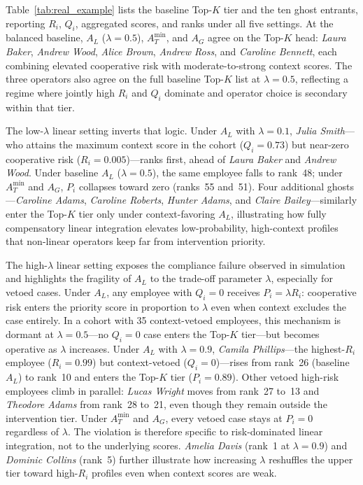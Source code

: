 \documentclass[mathematics,article,submit,moreauthors]{Definitions/mdpi}
\begin{document}
Table~\ref{tab:real_example} lists the baseline Top-$K$ tier and the ten ghost entrants, reporting $R_i$, $Q_i$, aggregated scores, and ranks under all five settings. At the balanced baseline, $A_L$ ($\lambda = 0.5$), $A_T^{\min}$, and $A_G$ agree on the Top-$K$ head: \textit{Laura Baker}, \textit{Andrew Wood}, \textit{Alice Brown}, \textit{Andrew Ross}, and \textit{Caroline Bennett}, each combining elevated cooperative risk with moderate-to-strong context scores. The three operators also agree on the full baseline Top-$K$ list at $\lambda = 0.5$, reflecting a regime where jointly high $R_i$ and $Q_i$ dominate and operator choice is secondary within that tier.

The low-$\lambda$ linear setting inverts that logic. Under $A_L$ with $\lambda = 0.1$, \textit{Julia Smith}---who attains the maximum context score in the cohort ($Q_i = 0.73$) but near-zero cooperative risk ($R_i = 0.005$)---ranks first, ahead of \textit{Laura Baker} and \textit{Andrew Wood}. Under baseline $A_L$ ($\lambda = 0.5$), the same employee falls to rank~48; under $A_T^{\min}$ and $A_G$, $P_i$ collapses toward zero (ranks~55 and~51). Four additional ghosts---\textit{Caroline Adams}, \textit{Caroline Roberts}, \textit{Hunter Adams}, and \textit{Claire Bailey}---similarly enter the Top-$K$ tier only under context-favoring $A_L$, illustrating how fully compensatory linear integration elevates low-probability, high-context profiles that non-linear operators keep far from intervention priority.

The high-$\lambda$ linear setting exposes the compliance failure observed in simulation and highlights the fragility of $A_L$ to the trade-off parameter $\lambda$, especially for vetoed cases. Under $A_L$, any employee with $Q_i = 0$ receives $P_i = \lambda R_i$: cooperative risk enters the priority score in proportion to $\lambda$ even when context excludes the case entirely. In a cohort with 35 context-vetoed employees, this mechanism is dormant at $\lambda = 0.5$---no $Q_i = 0$ case enters the Top-$K$ tier---but becomes operative as $\lambda$ increases. Under $A_L$ with $\lambda = 0.9$, \textit{Camila Phillips}---the highest-$R_i$ employee ($R_i = 0.99$) but context-vetoed ($Q_i = 0$)---rises from rank~26 (baseline $A_L$) to rank~10 and enters the Top-$K$ tier ($P_i = 0.89$). Other vetoed high-risk employees climb in parallel: \textit{Lucas Wright} moves from rank~27 to~13 and \textit{Theodore Adams} from rank~28 to~21, even though they remain outside the intervention tier. Under $A_T^{\min}$ and $A_G$, every vetoed case stays at $P_i = 0$ regardless of $\lambda$. The violation is therefore specific to risk-dominated linear integration, not to the underlying scores. \textit{Amelia Davis} (rank~1 at $\lambda = 0.9$) and \textit{Dominic Collins} (rank~5) further illustrate how increasing $\lambda$ reshuffles the upper tier toward high-$R_i$ profiles even when context scores are weak.
\end{document}
